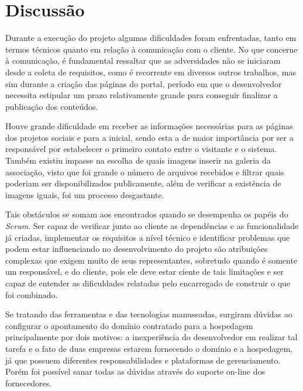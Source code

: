 \clearpage

\hspace{2.5cm}
\section{Discussão}
\hspace{2.5cm}

Durante a execução do projeto algumas dificuldades foram enfrentadas, tanto em termos técnicos quanto em relação à comunicação com o cliente. No que concerne à comunicação, é fundamental ressaltar que as adversidades não se iniciaram desde a coleta de requisitos, como é recorrente em diversos outros trabalhos, mas sim durante a criação das páginas do portal, período em que o desenvolvedor necessita estipular um prazo relativamente grande para conseguir finalizar a publicação dos conteúdos.

Houve grande dificuldade em receber as informações necessárias para as páginas dos projetos sociais e para a inicial, sendo esta a de maior importância por ser a responsável por estabelecer o primeiro contato entre o visitante e o sistema. Também existiu impasse na escolha de quais imagens inserir na galeria da associação, visto que foi grande o número de arquivos recebidos e filtrar quais poderiam ser disponibilizados publicamente, além de verificar a existência de imagens iguais, foi um processo desgastante.

Tais obstáculos se somam aos encontrados quando se desempenha os papéis do \textit{Scrum}. Ser capaz de verificar junto ao cliente as dependências e as funcionalidade já criadas, implementar os requisitos a nível técnico e identificar problemas que podem estar influenciando no desenvolvimento do projeto são atribuições complexas que exigem muito de seus representantes, sobretudo quando é somente um responsável, e do cliente, pois ele deve estar ciente de tais limitações e ser capaz de entender as dificuldades relatadas pelo encarregado de construir o que foi combinado.

Se tratando das ferramentas e das tecnologias manuseadas, surgiram dúvidas ao configurar o apontamento do domínio contratado para a hospedagem principalmente por dois motivos: a inexperiência do desenvolvedor em realizar tal tarefa e o fato de duas empresas estarem fornecendo o domínio e a hospedagem, já que possuem diferentes responsabilidades e plataformas de gerenciamento. Porém foi possível sanar todas as dúvidas através do suporte on-line dos fornecedores.

